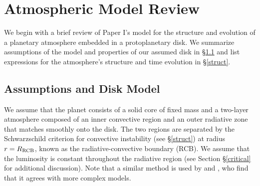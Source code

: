 



\section{Atmospheric Model Review}
\label{sec2}


We begin with a brief review of Paper I's model for the structure and evolution of a planetary atmosphere embedded in a protoplanetary disk. We summarize assumptions of the model and  properties of our assumed  disk in \S\ref{model} and list expressions for the atmosphere's structure and time evolution in \S\ref{struct}.  

\subsection{Assumptions and Disk Model}
\label{model}

We assume that the planet consists of a solid core of fixed mass and a two-layer atmosphere composed of an inner convective region and an outer radiative zone that matches smoothly onto the disk. The two regions are separated by the Schwarzschild criterion for convective instability (see \S\ref{struct}) at radius $r=R_{\rm RCB}$, known as the radiative-convective boundary (RCB). We assume that the luminosity is constant throughout the radiative region (see Section \S\ref{critical} for additional discussion). Note that a similar method is used by \citet{pn05} and \citet{mordasini12},  who find that it agrees with more complex models.

